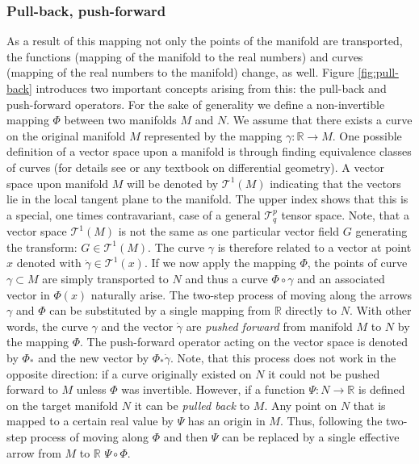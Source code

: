 \documentclass[a4paper,10pt]{article}
\begin{document}
\subsubsection{Pull-back, push-forward}
As a result of this mapping not only the points of the manifold are transported, the functions (mapping of the manifold to the real numbers) and curves (mapping of the real numbers to the manifold) change, as well. Figure \ref{fig:pull-back} introduces two important concepts arising from this: the pull-back and push-forward operators. For the sake of generality we define a non-invertible mapping $\Phi$ between two manifolds $M$ and $N$. We assume that there exists a curve on the original manifold $M$ represented by the mapping $\gamma: \mathbb{R} \to M$. One possible definition of a vector space upon a manifold is through finding equivalence classes of curves (for details see \cite{fecko} or any textbook on differential geometry). A vector space upon manifold $M$ will be denoted by $\mathcal{T}^1(M)$ indicating that the vectors lie in the local tangent plane to the manifold. The upper index shows that this is a special, one times contravariant, case of a general $\mathcal{T}_q^p$ tensor space. Note, that a vector space $\mathcal{T}^1(M)$ is not the same as one particular vector field $G$ generating the transform: $G \in \mathcal{T}^1(M)$. The curve $\gamma$ is therefore related to a vector at point $x$ denoted with $\dot{\gamma} \in \mathcal{T}^1(x)$. If we now apply the mapping $\Phi$, the points of curve $\gamma \subset M$ are simply transported to $N$ and thus a curve $\Phi \circ \gamma$ and an associated vector in $\Phi(x)$ naturally arise. The two-step process of moving along the arrows $\gamma$ and $\Phi$ can be substituted by a single mapping from $\mathbb{R}$ directly to $N$. With other words, the curve $\gamma$ and the vector $\dot{\gamma}$ are \emph{pushed forward} from manifold $M$ to $N$ by the mapping $\Phi$. The push-forward operator acting on the vector space is denoted by $\Phi_*$ and the new vector by $\Phi_* \dot{\gamma}$. Note, that this process does not work in the opposite direction: if a curve originally existed on $N$ it could not be pushed forward to $M$ unless $\Phi$ was invertible. However, if a function $\Psi: N \to \mathbb{R}$ is defined on the target manifold $N$ it can be \emph{pulled back} to $M$. Any point on $N$ that is mapped to a certain real value by $\Psi$ has an origin in $M$. Thus, following the two-step process of moving along $\Phi$ and then $\Psi$ can be replaced by a single effective arrow from $M$ to $\mathbb{R}$ $\Psi \circ \Phi$. 
\end{document}
